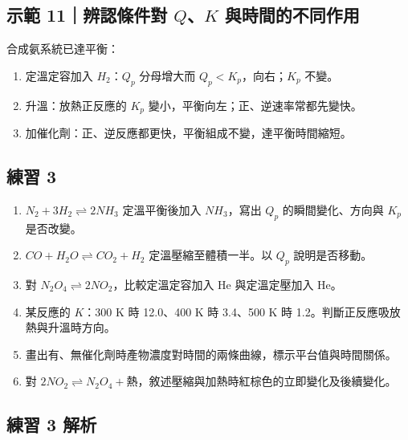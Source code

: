 \documentclass[11pt,a4paper]{article}
\providecommand{\tightlist}{%
  \setlength{\itemsep}{0pt}\setlength{\parskip}{0pt}}
\begin{document}
\begin{HandoutWorkedExample}

\subsection{\texorpdfstring{示範 11｜辨認條件對 \(Q\)、\(K\) 與時間的不同作用}{示範 11｜辨認條件對 Q、K 與時間的不同作用}}\label{ux793aux7bc4-11ux8fa8ux8a8dux689dux4ef6ux5c0d-qk-ux8207ux6642ux9593ux7684ux4e0dux540cux4f5cux7528}

合成氨系統已達平衡：

\begin{enumerate}
\def\labelenumi{\arabic{enumi}.}
\tightlist
\item
  定溫定容加入 \(H_2\)：\(Q_p\) 分母增大而 \(Q_p<K_p\)，向右；\(K_p\) 不變。
\item
  升溫：放熱正反應的 \(K_p\) 變小，平衡向左；正、逆速率常都先變快。
\item
  加催化劑：正、逆反應都更快，平衡組成不變，達平衡時間縮短。
\end{enumerate}

\end{HandoutWorkedExample}

\subsection{練習 3}\label{ux7df4ux7fd2-3}

\begin{enumerate}
\def\labelenumi{\arabic{enumi}.}
\tightlist
\item
  \(N_2+3H_2\rightleftharpoons2NH_3\) 定溫平衡後加入 \(NH_3\)，寫出 \(Q_p\) 的瞬間變化、方向與 \(K_p\) 是否改變。
\item
  \(CO+H_2O\rightleftharpoons CO_2+H_2\) 定溫壓縮至體積一半。以 \(Q_p\) 說明是否移動。
\item
  對 \(N_2O_4\rightleftharpoons2NO_2\)，比較定溫定容加入 He 與定溫定壓加入 He。
\item
  某反應的 \(K\)：300 K 時 12.0、400 K 時 3.4、500 K 時 1.2。判斷正反應吸放熱與升溫時方向。
\item
  畫出有、無催化劑時產物濃度對時間的兩條曲線，標示平台值與時間關係。
\item
  對 \(2NO_2\rightleftharpoons N_2O_4+\text{熱}\)，敘述壓縮與加熱時紅棕色的立即變化及後續變化。
\end{enumerate}

\subsection{練習 3 解析}\label{ux7df4ux7fd2-3-ux89e3ux6790}
\end{document}
